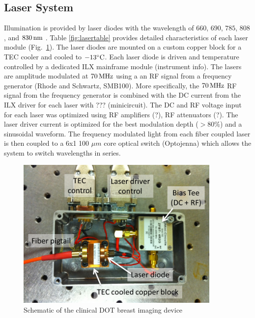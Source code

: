 \subsection{Laser System}
Illumination is provided by laser diodes with the wavelength of $660$, $690$, $785$, $808$, and $830\,{\rm nm}$ . Table \ref{fig:lasertable} provides detailed characteristics of each laser module (Fig.~\ref{fig:laserpic}). The laser diodes are mounted on a custom copper block for a TEC cooler and cooled to $-13^{\circ}{\rm C}$. Each laser diode is driven and temperature controlled by a dedicated ILX mainframe module (instrument info). The lasers are amplitude modulated at $70\,{\rm MHz}$ using a an RF signal from a frequency generator (Rhode and Schwartz, SMB100). More specifically, the $70\,{\rm MHz}$ RF signal from the frequency generator is combined with the DC current from the ILX driver for each laser with ??? (minicircuit). The DC and RF voltage input for each laser was optimized using RF amplifiers (?), RF attenuators (?). The laser driver current is optimized for the best modulation depth ($>80 \%$) and a sinusoidal waveform. The frequency modulated light from each fiber coupled laser is then coupled to a 6x1 100 $\mu m$ core optical switch (Optojenna) which allows the system to switch wavelengths in series.
\begin{figure}[ht]
\begin{center}
\includegraphics[width=10cm]{./figures/4_Gen3/laserpic.png}
\caption{Schematic of the clinical DOT breast imaging device}
\label{fig:laserpic}
\end{center}
\end{figure}

